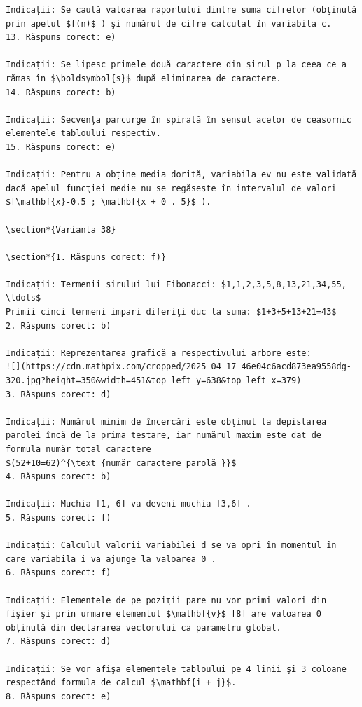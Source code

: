 \documentclass[10pt]{article}
\begin{document}
\begin{verbatim}
Indicații: Se caută valoarea raportului dintre suma cifrelor (obţinută prin apelul $f(n)$ ) şi numărul de cifre calculat în variabila c.
13. Răspuns corect: e)

Indicații: Se lipesc primele două caractere din şirul p la ceea ce a rămas în $\boldsymbol{s}$ după eliminarea de caractere.
14. Răspuns corect: b)

Indicații: Secvența parcurge în spirală în sensul acelor de ceasornic elementele tabloului respectiv.
15. Răspuns corect: e)

Indicații: Pentru a obține media dorită, variabila ev nu este validată dacă apelul funcţiei medie nu se regăseşte în intervalul de valori $[\mathbf{x}-0.5 ; \mathbf{x + 0 . 5}$ ).

\section*{Varianta 38}

\section*{1. Răspuns corect: f)}

Indicații: Termenii şirului lui Fibonacci: $1,1,2,3,5,8,13,21,34,55, \ldots$
Primii cinci termeni impari diferiţi duc la suma: $1+3+5+13+21=43$
2. Răspuns corect: b)

Indicații: Reprezentarea grafică a respectivului arbore este:
![](https://cdn.mathpix.com/cropped/2025_04_17_46e04c6acd873ea9558dg-320.jpg?height=350&width=451&top_left_y=638&top_left_x=379)
3. Răspuns corect: d)

Indicații: Numărul minim de încercări este obţinut la depistarea parolei încă de la prima testare, iar numărul maxim este dat de formula număr total caractere
$(52+10=62)^{\text {număr caractere parolă }}$
4. Răspuns corect: b)

Indicații: Muchia [1, 6] va deveni muchia [3,6] .
5. Răspuns corect: f)

Indicații: Calculul valorii variabilei d se va opri în momentul în care variabila i va ajunge la valoarea 0 .
6. Răspuns corect: f)

Indicații: Elementele de pe poziţii pare nu vor primi valori din fişier şi prin urmare elementul $\mathbf{v}$ [8] are valoarea 0 obținută din declararea vectorului ca parametru global.
7. Răspuns corect: d)

Indicații: Se vor afişa elementele tabloului pe 4 linii şi 3 coloane respectând formula de calcul $\mathbf{i + j}$.
8. Răspuns corect: e)


\end{verbatim}
\end{document}

